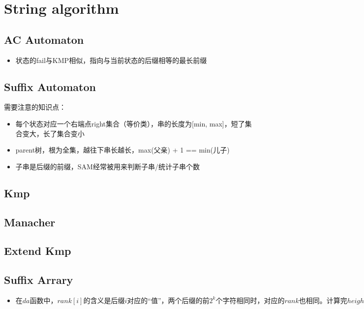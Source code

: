 \section{String algorithm}
	\subsection{AC Automaton}
		\begin{itemize}
			\item 状态的fail与KMP相似，指向与当前状态的后缀相等的最长前缀
		\end{itemize}
		
	\subsection{Suffix Automaton}
		\begin{flushleft}
			需要注意的知识点：
			\begin{itemize}
				\item 每个状态对应一个右端点right集合（等价类），串的长度为[min, max]，短了集合变大，长了集合变小
				\item parent树，根为全集，越往下串长越长，max(父亲) + 1 == min(儿子)
				\item 子串是后缀的前缀，SAM经常被用来判断子串/统计子串个数
			\end{itemize}
		\end{flushleft}
		
	\subsection{Kmp}
		
	\subsection{Manacher}
		
	\subsection{Extend Kmp}
		
	\subsection{Suffix Arrary}
		\begin{flushleft}
			\begin{itemize}
				\item $在da函数中，rank[i]的含义是后缀i对应的“值”，两个后缀的前2^k个字符相同时，对应的rank也相同。计算完height后，rank[i]代表后缀i在sa[]中的位置。$
			\end{itemize}
		\end{flushleft}
		
